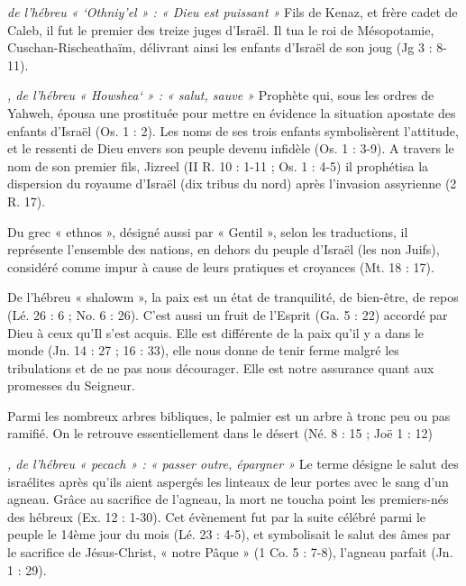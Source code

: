 \begin{multicols}{2}
\textit{de l'hébreu « `Othniy'el » : « Dieu est puissant »}\newline
Fils de Kenaz, et frère cadet de Caleb, il fut le premier des treize juges d'Israël.
Il tua le roi de Mésopotamie, Cuschan-Rischeathaïm, délivrant ainsi les enfants d'Israël de son joug (Jg 3 : 8-11).

\textit{, de l'hébreu « Howshea` » : « salut, sauve »}\newline
Prophète qui, sous les ordres de Yahweh, épousa une prostituée pour mettre en évidence la situation apostate des enfants d'Israël (Os. 1 : 2). Les noms de ses trois enfants symbolisèrent l'attitude, et le ressenti de Dieu envers son peuple devenu infidèle (Os. 1 : 3-9). A travers le nom de son premier fils, Jizreel (II R. 10 : 1-11 ; Os. 1 : 4-5) il prophétisa la dispersion du royaume d'Israël (dix tribus du nord) après l'invasion assyrienne (2 R. 17).

\textit{}\newline
 Du grec « ethnos », désigné aussi par « Gentil », selon les traductions, il représente l'ensemble des nations, en dehors du peuple d'Israël (les non Juifs), considéré comme impur à cause de leurs pratiques et croyances (Mt. 18 : 17).

\textit{}\newline
De l'hébreu « shalowm », la paix est un état de tranquilité, de bien-être, de repos (Lé. 26 : 6 ; No. 6 : 26). C'est aussi un fruit de l'Esprit (Ga. 5 : 22) accordé par Dieu à ceux qu'Il s'est acquis. Elle est différente de la paix qu'il y a dans le monde (Jn. 14 : 27 ; 16 : 33), elle nous donne de tenir ferme malgré les tribulations et de ne pas nous décourager. Elle est notre assurance quant aux promesses du Seigneur.

\textit{}\newline
Parmi les nombreux arbres bibliques, le palmier est un arbre à tronc peu ou pas ramifié. On le retrouve essentiellement dans le désert (Né. 8 : 15 ; Joë 1 : 12)

\textit{, de l'hébreu « pecach » : « passer outre, épargner »}\newline
Le terme désigne le salut des israélites après qu'ils aient aspergés les linteaux de leur portes avec le sang d'un agneau. Grâce au sacrifice de l'agneau, la mort ne toucha point les premiers-nés des hébreux (Ex. 12 : 1-30). Cet évènement fut par la suite célébré parmi le peuple le 14ème jour du mois (Lé. 23 : 4-5), et symbolisait le salut des âmes par le sacrifice de Jésus-Christ, « notre Pâque » (1 Co. 5 : 7-8), l'agneau parfait (Jn. 1 : 29).


\end{multicols}
